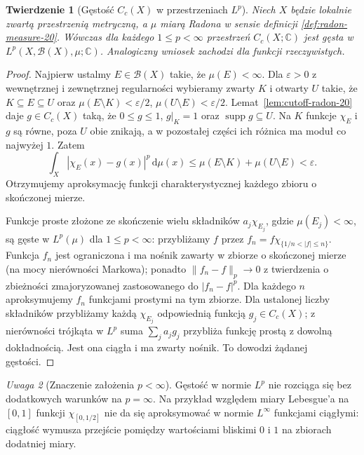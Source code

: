 \documentclass[11pt,a4paper,oneside]{book}
\numberwithin{equation}{chapter}
\theoremstyle{plain}
\newtheorem{twierdzenie}{Twierdzenie}[chapter]
\theoremstyle{definition}
\theoremstyle{remark}
\newtheorem{uwaga}[twierdzenie]{Uwaga}
\begin{document}
\begin{twierdzenie}[Gęstość $C_c(X)$ w przestrzeniach $L^p$]
\label{thm:cc-dense-lp-radon-20}
Niech $X$ będzie lokalnie zwartą przestrzenią metryczną,
a $\mu$ miarą Radona w sensie definicji
\ref{def:radon-measure-20}. Wówczas dla każdego
$1\le p<\infty$ przestrzeń $C_c(X;\mathbb C)$ jest
gęsta w $L^p(X,\mathcal B(X),\mu;\mathbb C)$.
Analogiczny wniosek zachodzi dla funkcji rzeczywistych.
\end{twierdzenie}
\begin{proof}
Najpierw ustalmy $E\in\mathcal B(X)$ takie, że
$\mu(E)<\infty$. Dla $\varepsilon>0$ z wewnętrznej
i zewnętrznej regularności wybieramy zwarty $K$
i otwarty $U$ takie, że
$K\subseteq E\subseteq U$ oraz
$\mu(E\setminus K)<\varepsilon/2$,
$\mu(U\setminus E)<\varepsilon/2$.
Lemat~\ref{lem:cutoff-radon-20} daje $g\in C_c(X)$
taką, że $0\le g\le1$, $g|_K=1$ oraz
$\operatorname{supp}g\subseteq U$.
Na $K$ funkcje $\chi_E$ i $g$ są równe, poza $U$
obie znikają, a w pozostałej części ich różnica
ma moduł co najwyżej $1$. Zatem
\[
 \int_X|\chi_E(x)-g(x)|^p\,\mathrm d\mu(x)
 \le\mu(E\setminus K)+\mu(U\setminus E)
 <\varepsilon.
\]
Otrzymujemy aproksymację funkcji charakterystycznej
każdego zbioru o skończonej mierze.

Funkcje proste złożone ze skończenie wielu składników
$a_j\chi_{E_j}$, gdzie $\mu(E_j)<\infty$, są gęste
w $L^p(\mu)$ dla $1\le p<\infty$:
przybliżamy $f$ przez
$f_n=f\chi_{\{1/n<|f|\le n\}}$.
Funkcja $f_n$ jest ograniczona i ma nośnik
zawarty w zbiorze o skończonej mierze
(na mocy nierówności Markowa); ponadto
$\|f_n-f\|_p\to0$ z twierdzenia o zbieżności
zmajoryzowanej zastosowanego do $|f_n-f|^p$.
Dla każdego $n$ aproksymujemy $f_n$
funkcjami prostymi na tym zbiorze.
Dla ustalonej liczby składników przybliżamy
każdą $\chi_{E_j}$ odpowiednią funkcją $g_j\in C_c(X)$;
z nierówności trójkąta w $L^p$ suma
$\sum_ja_jg_j$ przybliża funkcję prostą z dowolną
dokładnością. Jest ona ciągła i ma zwarty nośnik.
To dowodzi żądanej gęstości.
\end{proof}

\begin{uwaga}[Znaczenie założenia $p<\infty$]
Gęstość w normie $L^p$ nie rozciąga się bez dodatkowych
warunków na $p=\infty$. Na przykład względem miary
Lebesgue'a na $[0,1]$ funkcji $\chi_{[0,1/2]}$
nie da się aproksymować w normie $L^\infty$
funkcjami ciągłymi: ciągłość wymusza przejście pomiędzy
wartościami bliskimi $0$ i $1$ na zbiorach dodatniej miary.
\end{uwaga}
\end{document}
